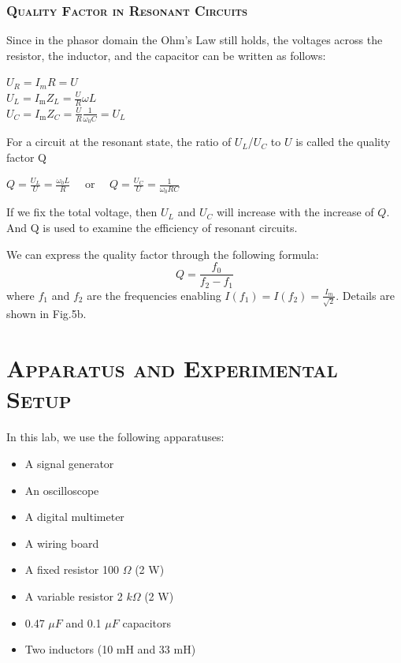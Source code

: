 \documentclass[a4paper,12pt]{article}
\begin{document}
\subsubsection{\textsc{Quality Factor in Resonant Circuits}}
Since in the phasor domain the Ohm's Law still holds, the voltages across the resistor, the inductor, and the capacitor can be written as follows:
\begin{center}
$\displaystyle U_R = I_m R = U$\\
$\displaystyle U_{L} =I_{\mathrm{m}} Z_{L}=\frac{U}{R} \omega L$ \\ 
$\displaystyle U_{C} =I_{\mathrm{m}} Z_{C}=\frac{U}{R} \frac{1}{\omega_{0} C}=U_{L}$ 
\end{center}

For a circuit at the resonant state, the ratio of $U_L$/$U_C$ to $U$ is called the quality factor Q 
\begin{center}
$\displaystyle Q=\frac{U_{L}}{U}=\frac{\omega_{0} L}{R} \quad \text { or } \quad Q=\frac{U_{C}}{U}=\frac{1}{\omega_{0} R C}$
\end{center}
\par If we fix the total voltage, then $U_L$ and $U_C$ will increase with the increase of $Q$. And Q is used to examine the efficiency of resonant circuits.
\par We can express the quality factor through the following formula:
\begin{equation}
Q = \frac{f_0}{f_2 - f_1}
\end{equation}
where $f_1$ and $f_2$ are the frequencies enabling $\displaystyle I(f_1) = I(f_2) = \frac{I_m}{\sqrt{2}}$. Details are shown in Fig.5b.
\section{\textsc{Apparatus and Experimental Setup}}
In this lab, we use the following apparatuses:
\begin{itemize}
\item A signal generator
\item An oscilloscope
\item A digital multimeter
\item A wiring board
\item A fixed resistor 100 $\Omega$ (2 W)
\item A variable resistor 2 $k\Omega$ (2 W)
\item 0.47 $\mu F$ and 0.1 $\mu F$ capacitors
\item Two inductors (10 mH and 33 mH)
\end{itemize}
\end{document}
